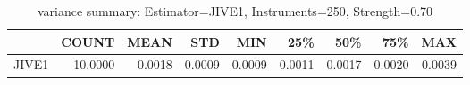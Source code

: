 \begin{table}[ht]
\centering
\caption{variance summary: Estimator=JIVE1, Instruments=250, Strength=0.70}
\begin{tabular}{lrrrrrrrr}
\toprule
 & COUNT & MEAN & STD & MIN & 25\% & 50\% & 75\% & MAX \\
\midrule
JIVE1 & 10.0000 & 0.0018 & 0.0009 & 0.0009 & 0.0011 & 0.0017 & 0.0020 & 0.0039 \\
\bottomrule
\end{tabular}
\end{table}
